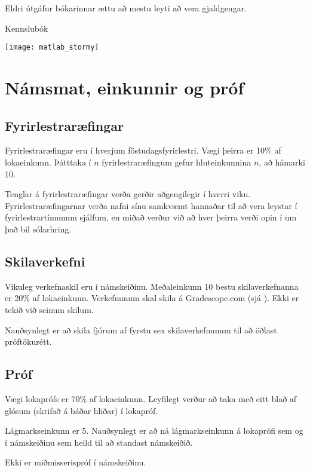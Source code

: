 \documentclass[justified, nobib]{tufte-handout}
\begin{document}
Eldri útgáfur bókarinnar ættu að mestu leyti að vera gjaldgengar.

\begin{marginfigure}
\caption{Kennslubók}
\begin{center}
\texttt{[image: matlab\_stormy]}
\end{center}
\end{marginfigure}

\section{Námsmat, einkunnir og próf}
\subsection{Fyrirlestraræfingar}
\label{sec:lecture-exercises}
Fyrirlestraræfingar eru í hverjum föstudagsfyrirlestri. Vægi þeirra er 10\% af lokaeinkunn. Þátttaka í $n$ fyrirlestraræfingum gefur hluteinkunnina $n$, að hámarki 10.

Tenglar á fyrirlestraræfingar verða gerðir aðgengilegir í hverri viku. Fyrirlestraræfingarnar verða nafni sínu samkvæmt hannaðar til að vera leystar í fyrirlestrartímunum sjálfum, en miðað verður við að hver þeirra verði opin í um það bil sólarhring.
\subsection{Skilaverkefni}
Vikuleg verkefnaskil eru í námskeiðinu. Meðaleinkunn 10 bestu skilaverkefnanna er 20\% af lokaeinkunn. Verkefnunum skal skila á Gradescope.com (sjá ). Ekki er tekið við seinum skilum.

Nauðsynlegt er að skila fjórum af fyrstu sex skilaverkefnunum til að öðlast próftökurétt.
\subsection{Próf}
Vægi lokaprófs er 70\% af lokaeinkunn. Leyfilegt verður að taka með eitt blað af glósum (skrifað á báðar hliðar) í lokapróf.

Lágmarkseinkunn er 5. Nauðsynlegt er að ná lágmarkseinkunn á lokaprófi sem og í námskeiðinu sem heild til að standast námskeiðið. 

Ekki er miðmisserispróf í námskeiðinu.
\end{document}
